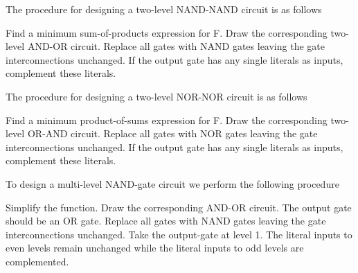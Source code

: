 \documentclass{report}
\begin{document}
The procedure for designing a two-level NAND-NAND circuit is as follows

\begin{enumerate}
	\ii Find a minimum sum-of-products expression for F.
	\ii Draw the corresponding two-level AND-OR circuit.
	\ii Replace all gates with NAND gates leaving the gate interconnections unchanged.
	\ii If the output gate has any single literals as inputs, complement these literals.
\end{enumerate}

The procedure for designing a two-level NOR-NOR circuit is as follows

\begin{enumerate}
	\ii Find a minimum product-of-sums expression for F.
	\ii Draw the corresponding two-level OR-AND circuit.
	\ii Replace all gates with NOR gates leaving the gate interconnections unchanged.
	\ii If the output gate has any single literals as inputs, complement these literals.
\end{enumerate}

To design a multi-level NAND-gate circuit we perform the following procedure

\begin{enumerate}
	\ii Simplify the function.
	\ii Draw the corresponding AND-OR circuit. The output gate should be an OR gate.
	\ii Replace all gates with NAND gates leaving the gate interconnections unchanged.
	\ii Take the output-gate at level 1. The literal inputs to even levels remain unchanged while the literal inputs to odd levels are complemented.
\end{enumerate}
\end{document}
